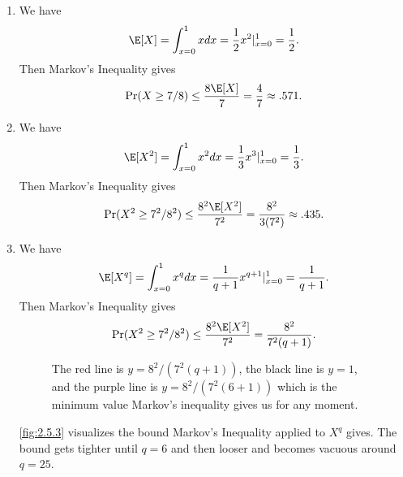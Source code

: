 \begin{enumerate}
    \item We have
    \begin{align}
        \E[X] = \int_{x=0}^1 x dx
        = \frac{1}{2}x^2 |_{x=0}^1
        = \frac{1}{2}.
        \nonumber
    \end{align}
    Then Markov's Inequality gives
    \begin{align}
        \Pr(X \geq 7/8) \leq \frac{8\E[X]}{7}
        = \frac{4}{7} \approx .571.
        \nonumber
    \end{align}

    \item We have
    \begin{align}
        \E[X^2] = \int_{x=0}^1 x^2 dx
        = \frac{1}{3}x^3 |_{x=0}^1
        = \frac{1}{3}.
        \nonumber
    \end{align}
    Then Markov's Inequality gives
    \begin{align}
        \Pr(X^2 \geq 7^2/8^2) \leq \frac{8^2\E[X^2]}{7^2}
        = \frac{8^2}{3(7^2)} \approx .435.
        \nonumber
    \end{align}

    \item We have
    \begin{align}
        \E[X^q] = \int_{x=0}^1 x^q dx
        = \frac{1}{q+1}x^{q+1} |_{x=0}^1
        = \frac{1}{q+1}.
        \nonumber
    \end{align}
    Then Markov's Inequality gives
    \begin{align}
        \Pr(X^2 \geq 7^2/8^2) \leq \frac{8^2\E[X^2]}{7^2}
        = \frac{8^2}{7^2(q+1)}.
        \nonumber
    \end{align}
    \begin{figure}[H]
        \centering
        \caption{The red line is $y=8^2/(7^2(q+1))$,
        the black line is $y=1$,
        and the purple line is $y=8^2/(7^2(6+1))$
        which is the minimum value Markov's
        inequality gives us for any moment.}
        \label{fig:2.5.3}
    \end{figure}
    \autoref{fig:2.5.3} visualizes the bound
    Markov's Inequality applied to $X^q$ gives.
    The bound gets tighter until $q=6$
    and then looser and becomes vacuous around $q=25$.


\end{enumerate}
